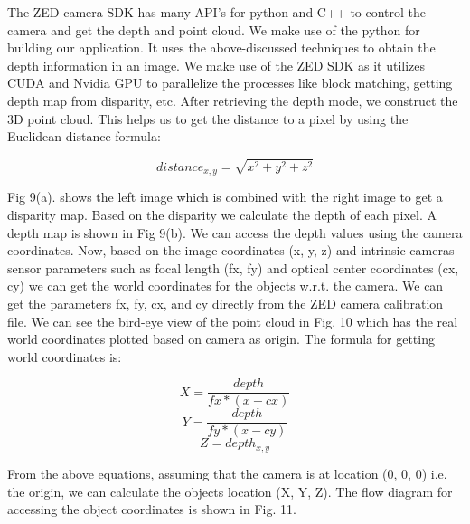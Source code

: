 \documentclass{IEEEtran}
\begin{document}
The ZED camera SDK has many API’s for python and C++ to control the camera and get the depth and point cloud. We make use of the python for building our application. It uses the above-discussed techniques to obtain the depth information in an image. We make use of the ZED SDK as it utilizes CUDA and Nvidia GPU to parallelize the processes like block matching, getting depth map from disparity, etc.
After retrieving the depth mode, we construct the 3D point cloud. This helps us to get the distance to a pixel by using the Euclidean distance formula:

\[distance_{x,y} = \sqrt{x^{2}+y^{2}+z^{2}}\]

Fig 9(a). shows the left image which is combined with the right image to get a disparity map. Based on the disparity we calculate the depth of each pixel. A depth map is shown in Fig 9(b). We can access the depth values using the camera coordinates. Now, based on the image coordinates (x, y, z) and intrinsic cameras sensor parameters such as focal length (fx, fy) and optical center coordinates (cx, cy) we can get the world coordinates for the objects w.r.t. the camera. We can get the parameters fx, fy, cx, and cy directly from the ZED camera calibration file. We can see the bird-eye view of the point cloud in Fig. 10 which has the real world coordinates plotted based on camera as origin. The formula for getting world coordinates is:

\[X = \frac{depth}{fx*(x-cx)}\]
\[Y = \frac{depth}{fy*(x-cy)}\]
\[Z = depth_{x,y}\]

From the above equations, assuming that the camera is at location (0, 0, 0) i.e. the origin, we can calculate the objects location (X, Y, Z). The flow diagram for accessing the object coordinates is shown in Fig. 11.
\end{document}

